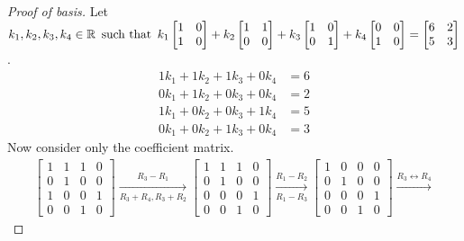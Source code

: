 \documentclass{article}
\begin{document}
\begin{proof}[Proof of basis]
    Let $k_1,k_2,k_3,k_4 \in \mathbb{R} \operatorname{~\text{such that}~} k_1\begin{bmatrix} 1 & 0 \\ 1 & 0 \end{bmatrix} + k_2\begin{bmatrix} 1 & 1 \\ 0 & 0 \end{bmatrix} + k_3\begin{bmatrix} 1 & 0 \\ 0 & 1 \end{bmatrix} + k_4\begin{bmatrix}0 & 0 \\ 1 & 0 \end{bmatrix} = \begin{bmatrix} 6 & 2 \\ 5 & 3 \end{bmatrix}$.
    \begin{align*}
        1k_1 + 1k_2 + 1k_3 + 0k_4 & = 6 \\
        0k_1 + 1k_2 + 0k_3 + 0k_4 & = 2 \\
        1k_1 + 0k_2 + 0k_3 + 1k_4 & = 5 \\
        0k_1 + 0k_2 + 1k_3 + 0k_4 & = 3
    \end{align*}
    Now consider only the coefficient matrix.
    \begin{align*}
        \begin{bmatrix}
            1 & 1 & 1 & 0 \\
            0 & 1 & 0 & 0 \\
            1 & 0 & 0 & 1 \\
            0 & 0 & 1 & 0
        \end{bmatrix} \xrightarrow[R_3 + R_4,R_3 + R_2]{R_3 - R_1}
        \begin{bmatrix}
            1 & 1 & 1 & 0 \\
            0 & 1 & 0 & 0 \\
            0 & 0 & 0 & 1 \\
            0 & 0 & 1 & 0
        \end{bmatrix} \xrightarrow[R_1 - R_3]{R_1 - R_2}
        \begin{bmatrix}
            1 & 0 & 0 & 0 \\
            0 & 1 & 0 & 0 \\
            0 & 0 & 0 & 1 \\
            0 & 0 & 1 & 0
        \end{bmatrix} \xrightarrow{R_3 \leftrightarrow R_4}

\end{align*}
\end{proof}
\end{document}
